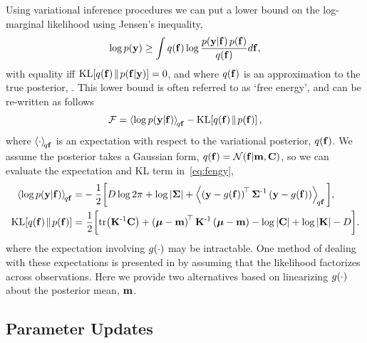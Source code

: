 \documentclass{article} %
\begin{document}
Using variational inference procedures we can put a lower bound on the
log-marginal likelihood using Jensen's inequality, 
\begin{equation}
    \log p\!\left({\mathbf{y}}\right) \geq \int q\!\left({\mathbf{f}}\right) \log 
        \frac{p\!\left({\mathbf{y}}\middle\vert{\ensuremath{\mathbf{f}}}\right)p\!\left({\mathbf{f}}\right)}{q\!\left({\mathbf{f}}\right)} d\mathbf{f},
\end{equation}
with equality iff $\text{KL}\!\left[{{q\!\left({\mathbf{f}}\right)}\!\parallel\!{p\!\left({\mathbf{f}}\middle\vert{\ensuremath{\mathbf{y}}}\right)}}\right] = 0$, and where
$q\!\left({\mathbf{f}}\right)$ is an approximation to the true posterior,
\probC{\lstate}{\obs}. This lower bound is often referred to as `free energy',
and can be re-written as follows
\begin{equation}
    \mathcal{F} = \left\langle{\log \ensuremath{p\!\left({\mathbf{y}}\middle\vert{\ensuremath{\mathbf{f}}}\right)}}\right\rangle_{\!{q\mathbf{f}}}
        - \text{KL}\!\left[{{q\!\left({\mathbf{f}}\right)}\!\parallel\!{p\!\left({\mathbf{f}}\right)}}\right],
    \label{eq:fengy}
\end{equation}
where $\left\langle{\cdot}\right\rangle_{\!{q\mathbf{f}}}$ is an expectation with respect to the
variational posterior, $q\!\left({\mathbf{f}}\right)$. We assume the posterior takes a
Gaussian form, $q\!\left({\mathbf{f}}\right) = \mathcal{N}\!\left({\mathbf{f}}\middle\vert{\ensuremath{\mathbf{m}}, \ensuremath{\mathbf{C}}}\right)$, so
we can evaluate the expectation and KL term in~\eqref{eq:fengy},
\begin{align}
    \expec{q\lstate}{\log \probC{\obs}{\lstate}}
        =& -\frac{1}{2} \bigg[ 
            D\log{2\pi} + \log\deter{\lcov} 
            + \expec{q\lstate}{\brac{\obs - \nonlin{\lstate}}\transpose\lcov\inv
            \brac{\obs - \nonlin{\lstate}}}\bigg],
            \label{eq:qlike} \\
     \KL{\qrob{\lstate}}{\prob{\lstate}}
        =& ~\frac{1}{2} \bigg[\trace{\prcov\inv\pocov}
        + \brac{\prmean - \pomean}\transpose\prcov\inv
        \brac{\prmean - \pomean} 
        - \log\deter{\pocov} + \log\deter{\prcov}
        - D\bigg] \label{eq:qkl}.
\end{align}
where the expectation involving $g\!\left({{\cdot}}\right)$ may be intractable. One method
of dealing with these expectations is presented in \cite{Opper2009} by assuming
that the likelihood factorizes across observations. Here we provide two
alternatives based on linearizing $g\!\left({{\cdot}}\right)$ about  the posterior mean,
$\mathbf{m}$.


\subsection{Parameter Updates}
\end{document}
